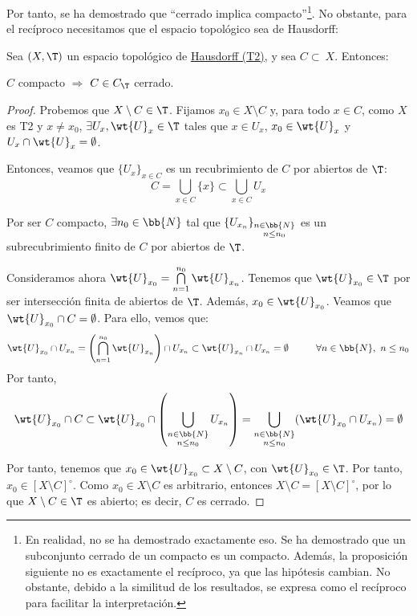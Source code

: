 Por tanto, se ha demostrado que ``cerrado implica compacto''\footnote{En realidad, no se ha demostrado exactamente eso.
Se ha demostrado que un subconjunto cerrado de un compacto es un compacto. Además, la proposición siguiente no es exactamente el
recíproco, ya que las hipótesis cambian. No obstante, debido a la similitud de los resultados, se expresa
como el recíproco para facilitar la interpretación.}. No obstante, para el recíproco necesitamos que el espacio topológico sea de Hausdorff:
\begin{prop}\label{prop:CompactoCerradoHausdorff}
    Sea $(X,\T)$ un espacio topológico de \ul{Hausdorff (T2)}, y sea $C\subset~X$. Entonces:
    \begin{center}
        $C$ compacto $\Longrightarrow$ $C\in C_\T$ cerrado.
    \end{center}
\end{prop}
\begin{proof}
    Probemos que $X\setminus C\in \T$. Fijamos $x_0\in X\setminus C$ y, para todo $x\in C$, como $X$ es T2 y $x\neq x_0$,
    $\exists U_x, \wt{U}_x\in \T$ tales que $x\in U_x$, $x_0\in \wt{U}_x$ y $U_x\cap \wt{U}_x=\emptyset$.

    Entonces, veamos que $\{U_x\}_{x\in C}$ es un recubrimiento de $C$ por abiertos de $\T$:
    \begin{equation*}
        C= \bigcup_{x\in C}\{x\} \subset \bigcup_{x\in C}U_x
    \end{equation*}


    Por ser $C$ compacto, $\exists n_0\in \bb{N}$ tal que $\{U_{x_n}\}_{\substack{n\in \bb{N}\\n\leq n_0}}$ es un subrecubrimiento finito de $C$ por abiertos de $\T$.

    Consideramos ahora $\wt{U}_{x_0}=\bigcap\limits_{n=1}^{n_0}\wt{U}_{x_n}$. Tenemos que $\wt{U}_{x_0}\in \T$ por ser intersección finita de abiertos de $\T$. Además, $x_0\in \wt{U}_{x_0}$.
    Veamos que $\wt{U}_{x_0}\cap C=\emptyset$. Para ello, vemos que:
    \begin{equation*}
        \wt{U}_{x_0}\cap U_{x_n} = \left(\bigcap\limits_{n=1}^{n_0}\wt{U}_{x_n}\right) \cap U_{x_n} \subset \wt{U}_{x_n}\cap U_{x_n} = \emptyset \hspace{1cm}
        \forall n\in \bb{N},~n\leq n_0
    \end{equation*}
    Por tanto,
    \begin{equation*}
        \wt{U}_{x_0}\cap C \subset \wt{U}_{x_0}\cap \left(\bigcup_{\substack{n\in \bb{N}\\n\leq n_0}}U_{x_n}\right) = \bigcup_{\substack{n\in \bb{N}\\n\leq n_0}}(\wt{U}_{x_0}\cap U_{x_n}) = \emptyset
    \end{equation*}

    Por tanto, tenemos que $x_0\in \wt{U}_{x_0}\subset X\setminus C$, con $\wt{U}_{x_0}\in \T$. Por tanto, $x_0\in [X\setminus C]^\circ$.
    Como $x_0\in X\setminus C$ es arbitrario, entonces $X\setminus C=[X\setminus C]^\circ$, por lo que $X\setminus C\in \T$ es abierto; es decir, $C$ es cerrado.
\end{proof}

